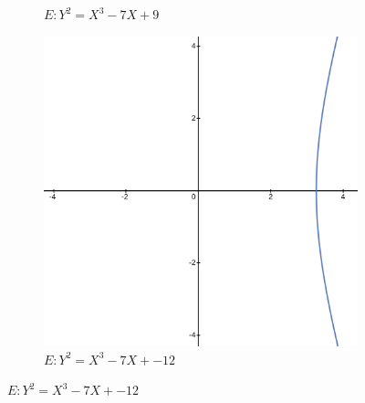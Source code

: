 \documentclass{article}
\begin{document}
\begin{figure}[h!]
\begin{subfigure}[h]{0.3\linewidth}
  \caption{$E: Y^2 = X^3 - 7X + 9$}
\end{subfigure}
\hfill
\begin{subfigure}[h]{0.3\linewidth}
  \includegraphics[width=\linewidth]{img/hw_12_3.png}
  \caption{$E: Y^2 = X^3 - 7X + -12$}
\end{subfigure}%


\end{figure}
\end{document}
